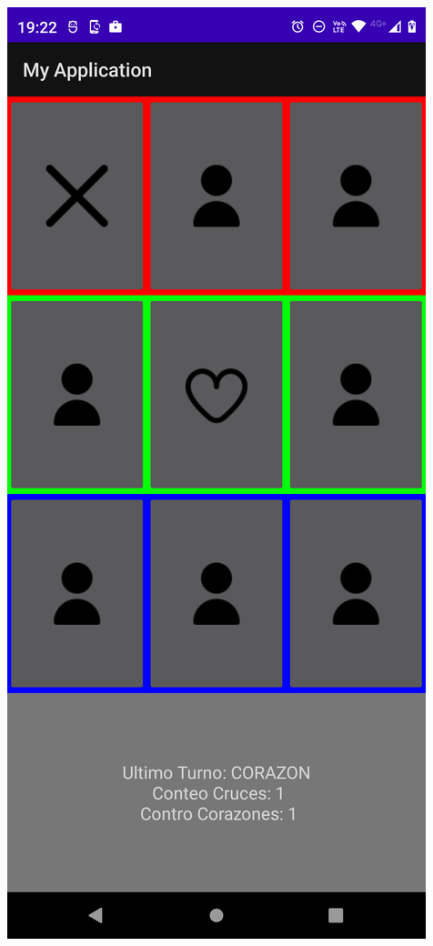 \begin{frame}[fragile]
\begin{columns}
\begin{center}
\end{center}
\begin{center}
\includegraphics[width=0.95\linewidth]{00_ComportamientoAplicacionTicTacToe/Etapa2_Fase2B.png}    
\end{center}

\end{columns}
\end{frame}



